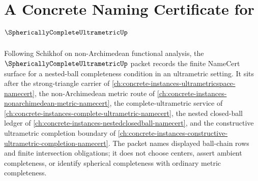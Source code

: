 \chapter{A Concrete Naming Certificate for $\SphericallyCompleteUltrametricUp$}
\label{ch:concrete-instances-spherically-complete-ultrametric-namecert}

Following Schikhof on non-Archimedean functional analysis, the $\SphericallyCompleteUltrametricUp$ packet records the finite NameCert surface for a nested-ball completeness condition in an ultrametric setting. It sits after the strong-triangle carrier of \autoref{ch:concrete-instances-ultrametricspace-namecert}, the non-Archimedean metric route of \autoref{ch:concrete-instances-nonarchimedean-metric-namecert}, the complete-ultrametric service of \autoref{ch:concrete-instances-complete-ultrametric-namecert}, the nested closed-ball ledger of \autoref{ch:concrete-instances-nestedclosedball-namecert}, and the constructive ultrametric completion boundary of \autoref{ch:concrete-instances-constructive-ultrametric-completion-namecert}. The packet names displayed ball-chain rows and finite intersection obligations; it does not choose centers, assert ambient completeness, or identify spherical completeness with ordinary metric completeness.

